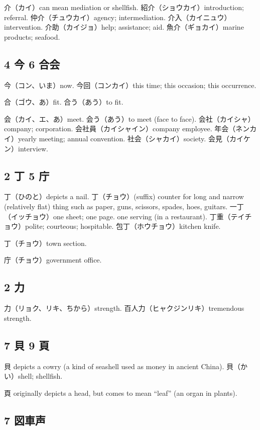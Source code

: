 介（カイ）can mean mediation or shellfish.
紹介（ショウカイ）introduction; referral.
仲介（チュウカイ）agency; intermediation.
介入（カイニュウ）intervention.
介助（カイジョ）help; assistance; aid.
魚介（ギョカイ）marine products; seafood.

\subsection{4 今 6 合会}

今（コン、いま）now.
今回（コンカイ）this time; this occasion; this occurrence.

合（ゴウ、あ）fit.
合う（あう）to fit.

会（カイ、エ、あ）meet.
会う（あう）to meet (face to face).
会社（カイシャ）company; corporation.
会社員（カイシャイン）company employee.
年会（ネンカイ）yearly meeting; annual convention.
社会（シャカイ）society.
会見（カイケン）interview.

\subsection{2 丁 5 庁}

丁（ひのと）depicts a nail.
丁（チョウ）(suffix)
counter for long and narrow (relatively flat) thing
such as paper, guns, scissors, spades, hoes, guitars.
一丁（イッチョウ）one sheet; one page.
one serving (in a restaurant).
丁重（テイチョウ）polite; courteous; hospitable.
包丁（ホウチョウ）kitchen knife.

丁（チョウ）town section.

庁（チョウ）government office.

\subsection{2 力}

力（リョク、リキ、ちから）strength.
百人力（ヒャクジンリキ）tremendous strength.

\subsection{7 貝 9 頁}

貝 depicts a cowry (a kind of seashell used as money in ancient China).
貝（かい）shell; shellfish.

頁 originally depicts a head,
but comes to mean ``leaf'' (an organ in plants).

\subsection{7 図車声}

